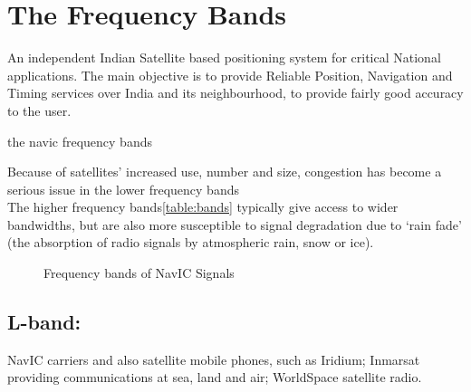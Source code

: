 




%


\section{The Frequency Bands}
An independent Indian Satellite based positioning system for critical National applications. The main objective is to provide Reliable Position, Navigation and Timing services over India and its neighbourhood, to provide fairly good accuracy to the user. 

	
	\begin{table}[h!]
	\small
	\centering
	\caption{the navic frequency bands}
	\label{table:bands}
	
	\end{table}

Because of satellites’ increased use, number and size, congestion has become a serious issue in the lower frequency bands
\\
The higher frequency bands\ref{table:bands} typically give access to wider bandwidths, but are also more susceptible to signal degradation due to ‘rain fade’ (the absorption of radio signals by atmospheric rain, snow or ice).
	\begin{figure}[h!]
	\centering
	
	\caption{Frequency bands of NavIC Signals}
	\label{figure:bandsfig}
	\end{figure}	
\subsection{L-band:}
NavIC carriers and also satellite mobile phones, such as Iridium; Inmarsat providing communications at sea, land and air; WorldSpace satellite radio.

